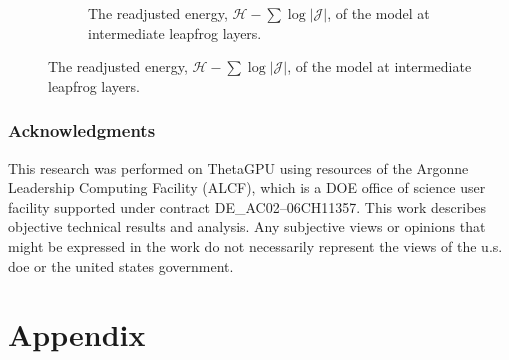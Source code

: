 \documentclass{article} %
\begin{document}
\begin{figure}[htpb]
\begin{subfigure}{0.31\textwidth}
      \caption{The readjusted energy, \(\mathcal{H}-\sum\log|\mathcal{J}|\), of the model at intermediate leapfrog layers.}
   \end{subfigure}
   
\end{figure}
%

\subsubsection*{Acknowledgments}
This research was performed on ThetaGPU using resources of the Argonne Leadership Computing Facility (ALCF), which is a DOE office of science user
facility supported under contract DE\_AC02--06CH11357.%
%
This work describes objective technical results and analysis.
%
Any subjective views or opinions that might be expressed in the work do not necessarily represent the views of the u.s.
doe or the united states government.




\appendix
\section{Appendix}
%
\end{document}

